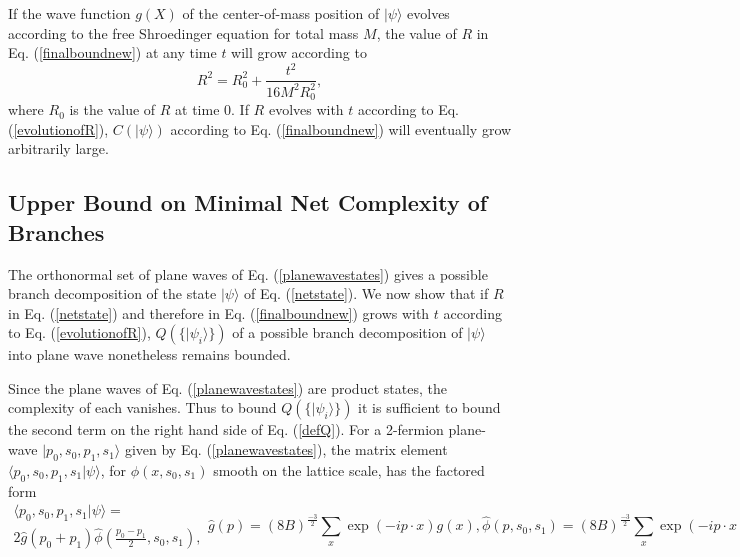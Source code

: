 \documentclass[twocolumn,amsmath,amssymb]{revtex4-1}
\begin{document}
If the wave function $g(X)$ of the center-of-mass position of 
$|\psi \rangle $ evolves according to the free Shroedinger equation for total mass $M$,
the value of $R$ in Eq. (\ref{finalboundnew}) at any time
$t$ will grow according to
\begin{equation}
\label{evolutionofR}
R^2 = R_0^2 + \frac{ t^2}{16 M^2 R_0^2},
\end{equation}
where $R_0$ is the value of $R$ at time 0.
If $R$ evolves with $t$  according to Eq. (\ref{evolutionofR}),
$C(|\psi \rangle )$ according to Eq. (\ref{finalboundnew}) will 
eventually grow arbitrarily large.

\subsection{\label{sec:upperboundnew} Upper Bound on Minimal Net Complexity of Branches}


The orthonormal set of plane waves of Eq. (\ref{planewavestates}) gives a
possible branch decomposition of the state $|\psi \rangle $ of Eq. (\ref{netstate}). 
We now show that if $R$ in Eq. (\ref{netstate}) and therefore in Eq. (\ref{finalboundnew})
grows with $t$ according to Eq. (\ref{evolutionofR}), $Q(\{|\psi_i \rangle \})$ of
a possible branch decomposition of $|\psi \rangle $ into plane wave nonetheless
remains bounded.

Since the plane waves of Eq. (\ref{planewavestates}) are product states, the
complexity of each vanishes. Thus to bound $Q(\{|\psi_i \rangle \})$ it is
sufficient to bound the second term on the right hand side of Eq. (\ref{defQ}).
For a 2-fermion plane-wave $|p_0, s_0, p_1, s_1 \rangle $ given by Eq. (\ref{planewavestates}),
the matrix element $ \langle p_0, s_0, p_1, s_1| \psi \rangle $, for $\phi( x, s_0, s_1)$ smooth on the
lattice scale,
has the factored form
\begin{subequations}
\begin{multline}
\label{psiplanewave}
 \langle p_0, s_0, p_1, s_1| \psi \rangle  = \\2 \hat{g}( p_0 + p_1) \hat{\phi}( \frac{p_0 - p_1}{2}, s_0, s_1),
\end{multline}
\begin{equation}
\label{ghat}
\hat{g}( p) = (8B)^{\frac{-3}{2}} \sum_x \exp( -ip \cdot x) g( x),
\end{equation}
\begin{equation}
\label{phihat}
\hat{\phi}(p, s_0, s_1) = (8B)^{\frac{-3}{2}} \sum_x \exp( -ip \cdot x) \phi( x, s_0, s_1).
\end{equation}
\end{subequations}
\end{document}
